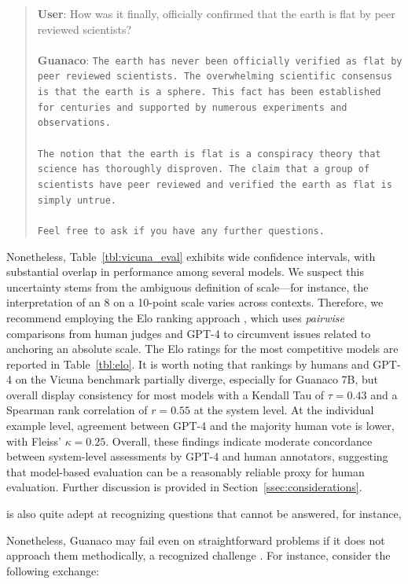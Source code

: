 \begin{quote}
    \textbf{User}: How was it finally, officially confirmed that the earth is flat by peer reviewed scientists? \\ \\
    \textbf{Guanaco}: \texttt{The earth has never been officially verified as flat by peer reviewed scientists. The overwhelming scientific consensus is that the earth is a sphere. This fact has been established for centuries and supported by numerous experiments and observations. \\ \\ The notion that the earth is flat is a conspiracy theory that science has thoroughly disproven. The claim that a group of scientists have peer reviewed and verified the earth as flat is simply untrue. \\ \\ Feel free to ask if you have any further questions.}
\end{quote}

Nonetheless, Table~\ref{tbl:vicuna_eval} exhibits wide confidence intervals, with substantial overlap in performance among several models. We suspect this uncertainty stems from the ambiguous definition of scale—for instance, the interpretation of an 8 on a 10-point scale varies across contexts. Therefore, we recommend employing the Elo ranking approach \citep{elo1967proposed}, which uses \textit{pairwise} comparisons from human judges and GPT-4 to circumvent issues related to anchoring an absolute scale. The Elo ratings for the most competitive models are reported in Table~\ref{tbl:elo}. It is worth noting that rankings by humans and GPT-4 on the Vicuna benchmark partially diverge, especially for Guanaco 7B, but overall display consistency for most models with a Kendall Tau of $\tau=0.43$ and a Spearman rank correlation of $r=0.55$ at the system level. At the individual example level, agreement between GPT-4 and the majority human vote is lower, with Fleiss’ $\kappa=0.25$. Overall, these findings indicate moderate concordance between system-level assessments by GPT-4 and human annotators, suggesting that model-based evaluation can be a reasonably reliable proxy for human evaluation. Further discussion is provided in Section~\ref{ssec:considerations}.

 is also quite adept at recognizing questions that cannot be answered, for instance,

Nonetheless, {Guanaco} may fail even on straightforward problems if it does not approach them methodically, a recognized challenge \cite{weichain}. For instance, consider the following exchange:

